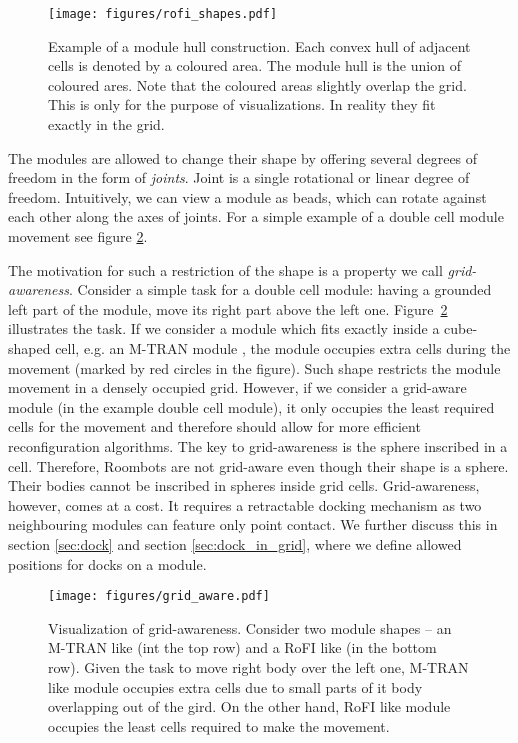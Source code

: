 \begin{figure}[!ht]
    \centering
    \texttt{[image: figures/rofi\_shapes.pdf]}
    \caption{Example of a module hull construction. Each convex hull of adjacent
    cells is denoted by a coloured area. The module hull is the union of coloured
    ares. Note that the coloured areas slightly overlap the grid. This is only
    for the purpose of visualizations. In reality they fit exactly in the grid.}
    \label{fig:rofi_shapes}
\end{figure}

The modules are allowed to change their shape by offering several degrees of
freedom in the form of \emph{joints}. Joint is a single rotational or linear
degree of freedom. Intuitively, we can view a module as beads, which can rotate
against each other along the axes of joints. For a simple example of a double
cell module movement see figure \ref{fig:grid_aware}.

The motivation for such a restriction of the shape is a property we call
\emph{grid-awareness}. Consider a simple task for a double cell module: having a
grounded left part of the module, move its right part above the left one.
Figure~\ref{fig:grid_aware} illustrates the task. If we consider a module which
fits exactly inside a cube-shaped cell, e.g. an M-TRAN module
\cite{haruhisa_kurokawa_m-tran_2003}, the module occupies extra cells during the
movement (marked by red circles in the figure). Such shape restricts the module
movement in a densely occupied grid. However, if we consider a grid-aware module
(in the example double cell module), it only occupies the least required cells
for the movement and therefore should allow for more efficient reconfiguration
algorithms. The key to grid-awareness is the sphere inscribed in a cell.
Therefore, Roombots\cite{bonardi_locomotion_2012} are not grid-aware even though
their shape is a sphere. Their bodies cannot be inscribed in spheres inside grid
cells. Grid-awareness, however, comes at a cost. It requires a retractable
docking mechanism as two neighbouring modules can feature only point contact. We
further discuss this in section \ref{sec:dock} and section
\ref{sec:dock_in_grid}, where we define allowed positions for docks on a module.

\begin{figure}[!t]
    \centering
    \texttt{[image: figures/grid\_aware.pdf]}
    \caption{Visualization of grid-awareness. Consider two module shapes -- an
    M-TRAN\cite{haruhisa_kurokawa_m-tran_2003} like (int the top row) and a RoFI
    like (in the bottom row). Given the task to move right body over the left
    one, M-TRAN like module occupies extra cells due to small parts of it body
    overlapping out of the gird. On the other hand, RoFI like module occupies
    the least cells required to make the movement. }
    \label{fig:grid_aware}
\end{figure}

